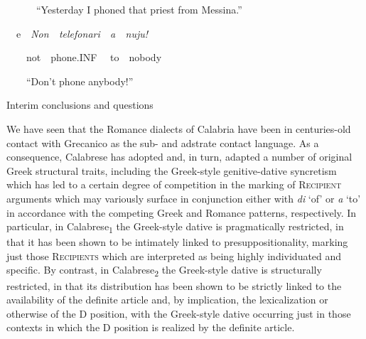 \documentclass[output=paper,modfonts,nonflat]{langsci/langscibook}
\begin{document}
\begin{styleStandard}
\ \ \ \ \ \ “Yesterday I phoned that priest from Messina.”
\end{styleStandard}

\begin{styleStandard}
\ \ e\ \ \textit{Non\ \ telefonari\ \ a\ \ nuju!}\ \ 
\end{styleStandard}

\begin{styleStandard}
\ \ \ \ not\ \ phone.INF \ \ to\ \ nobody
\end{styleStandard}

\begin{styleStandard}
\ \ \ \ “Don’t phone anybody!”
\end{styleStandard}


\setcounter{listWWNumxileveli}{0}
\begin{listWWNumxileveli}
\item 

\setcounter{listWWNumxilevelii}{0}
\begin{listWWNumxilevelii}
\item 
\begin{stylelsSectionii}
Interim conclusions and questions
\end{stylelsSectionii}
\end{listWWNumxilevelii}
\end{listWWNumxileveli}
\begin{styleStandard}
We have seen that the Romance dialects of Calabria have been in centuries-old contact with Grecanico as the sub- and adstrate contact language. As a consequence, Calabrese has adopted and, in turn, adapted a number of original Greek structural traits, including the Greek-style genitive-dative syncretism which has led to a certain degree of competition in the marking of \textsc{Recipient} arguments which may variously surface in conjunction either with \textit{di }‘of’ or \textit{a }‘to’ in accordance with the competing Greek and Romance patterns, respectively. In particular, in Calabrese\textsubscript{1} the Greek-style dative is pragmatically restricted, in that it has been shown to be intimately linked to presuppositionality, marking just those \textsc{Recipients} which are interpreted as being highly individuated and specific. By contrast, in Calabrese\textsubscript{2} the Greek-style dative is structurally restricted, in that its distribution has been shown to be strictly linked to the availability of the definite article and, by implication, the lexicalization or otherwise of the D position, with the Greek-style dative occurring just in those contexts in which the D position is realized by the definite article.
\end{styleStandard}
\end{document}
